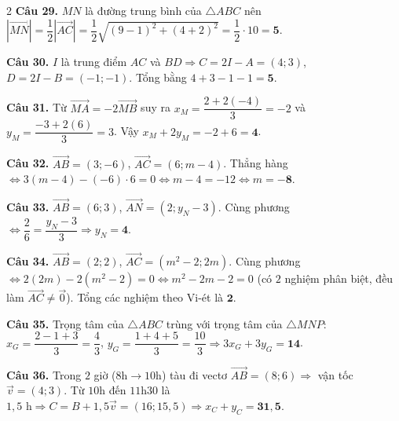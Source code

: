 \documentclass[12pt,a4paper]{article}
\begin{document}
\begin{multicols}{2}
\textbf{Câu 29.} $MN$ là đường trung bình của $\triangle ABC$ nên $|\vec{MN}| = \dfrac{1}{2}|\vec{AC}| = \dfrac{1}{2}\sqrt{(9-1)^2 + (4+2)^2} = \dfrac{1}{2}\cdot 10 = \mathbf{5}$.\par\vspace{3pt}

\textbf{Câu 30.} $I$ là trung điểm $AC$ và $BD \Rightarrow C = 2I - A = (4; 3)$, $D = 2I - B = (-1; -1)$. Tổng bằng $4 + 3 - 1 - 1 = \mathbf{5}$.\par\vspace{3pt}

\textbf{Câu 31.} Từ $\vec{MA} = -2\vec{MB}$ suy ra $x_M = \dfrac{2 + 2(-4)}{3} = -2$ và $y_M = \dfrac{-3 + 2(6)}{3} = 3$. Vậy $x_M + 2y_M = -2 + 6 = \mathbf{4}$.\par\vspace{3pt}

\textbf{Câu 32.} $\vec{AB} = (3; -6)$, $\vec{AC} = (6; m - 4)$. Thẳng hàng $\Leftrightarrow 3(m - 4) - (-6)\cdot 6 = 0 \Leftrightarrow m - 4 = -12 \Leftrightarrow m = \mathbf{-8}$.\par\vspace{3pt}

\textbf{Câu 33.} $\vec{AB} = (6; 3)$, $\vec{AN} = (2; y_N - 3)$. Cùng phương $\Leftrightarrow \dfrac{2}{6} = \dfrac{y_N - 3}{3} \Rightarrow y_N = \mathbf{4}$.\par\vspace{3pt}

\textbf{Câu 34.} $\vec{AB} = (2; 2)$, $\vec{AC} = (m^2 - 2; 2m)$. Cùng phương $\Leftrightarrow 2(2m) - 2(m^2 - 2) = 0 \Leftrightarrow m^2 - 2m - 2 = 0$ (có $2$ nghiệm phân biệt, đều làm $\vec{AC} \ne \vec{0}$). Tổng các nghiệm theo Vi-ét là $\mathbf{2}$.\par\vspace{3pt}

\textbf{Câu 35.} Trọng tâm của $\triangle ABC$ trùng với trọng tâm của $\triangle MNP$: $x_G = \dfrac{2-1+3}{3} = \dfrac{4}{3}$, $y_G = \dfrac{1+4+5}{3} = \dfrac{10}{3} \Rightarrow 3x_G + 3y_G = \mathbf{14}$.\par\vspace{3pt}

\textbf{Câu 36.} Trong $2$ giờ ($8\text{h}\to 10\text{h}$) tàu đi vectơ $\vec{AB} = (8; 6) \Rightarrow$ vận tốc $\vec{v} = (4; 3)$. Từ $10\text{h}$ đến $11\text{h}30$ là $1{,}5\text{ h} \Rightarrow C = B + 1{,}5\vec{v} = (16; 15{,}5) \Rightarrow x_C + y_C = \mathbf{31{,}5}$.\par\vspace{3pt}


\end{multicols}
\end{document}
